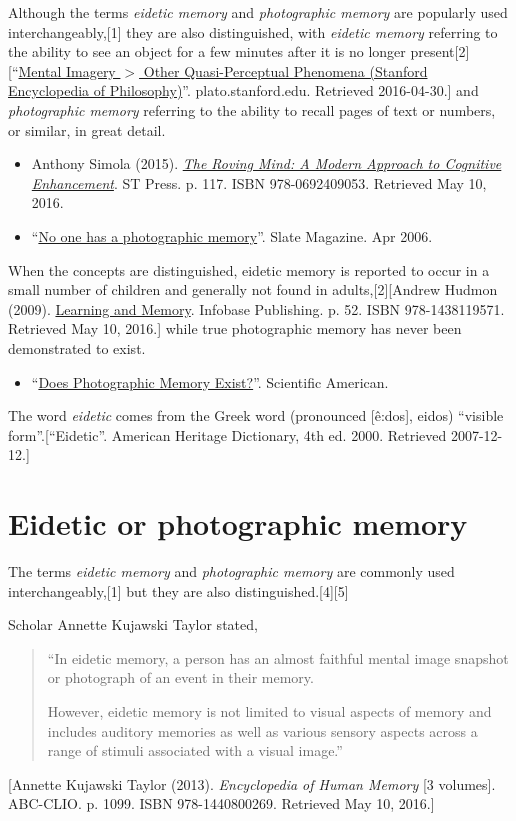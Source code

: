 \documentclass{book}
\numberwithin{equation}{section}
\begin{document}
Although the terms \textit{eidetic memory} and \textit{photographic memory} are popularly used interchangeably,[1] they are also distinguished, with \textit{eidetic memory} referring to the ability to see an object for a few minutes after it is no longer present[2][``\href{http://plato.stanford.edu/entries/mental-imagery/quasi-perceptual.html}{Mental Imagery $>$ Other Quasi-Perceptual Phenomena (Stanford Encyclopedia of Philosophy)}''. plato.stanford.edu. Retrieved 2016-04-30.] and \textit{photographic memory} referring to the ability to recall pages of text or numbers, or similar, in great detail.
\begin{itemize}
    \item Anthony Simola (2015). \href{https://books.google.com/books?id=p4ZMBwAAQBAJ&pg=PT117}{\textit{The Roving Mind: A Modern Approach to Cognitive Enhancement}}. ST Press. p. 117. ISBN 978-0692409053. Retrieved May 10, 2016.
    \item ``\href{http://www.slate.com/articles/health_and_science/science/2006/04/kaavya_syndrome.single.html}{No one has a photographic memory}''. Slate Magazine. Apr 2006.
\end{itemize}
When the concepts are distinguished, eidetic memory is reported to occur in a small number of children and generally not found in adults,[2][Andrew Hudmon (2009). \href{https://books.google.com/books?id=GKdUyxrqL6kC&pg=PA52}{Learning and Memory}. Infobase Publishing. p. 52. ISBN 978-1438119571. Retrieved May 10, 2016.] while true photographic memory has never been demonstrated to exist.
\begin{itemize}
    \item ``\href{http://www.scientificamerican.com/article/i-developed-what-appears-to-be-a-ph/}{Does Photographic Memory Exist?}''. Scientific American.
\end{itemize}
%
The word \textit{eidetic} comes from the Greek word  (pronounced [\^e:dos], eidos) ``visible form''.[``Eidetic''. American Heritage Dictionary, 4th ed. 2000. Retrieved 2007-12-12.]

\section{Eidetic or photographic memory}
The terms \textit{eidetic memory} and \textit{photographic memory} are commonly used interchangeably,[1] but they are also distinguished.[4][5]

Scholar Annette Kujawski Taylor stated,
\begin{quotation}
    ``In eidetic memory, a person has an almost faithful mental image snapshot or photograph of an event in their memory.
    
    However, eidetic memory is not limited to visual aspects of memory and includes auditory memories as well as various sensory aspects across a range of stimuli associated with a visual image.''
\end{quotation}
[Annette Kujawski Taylor (2013). \textit{Encyclopedia of Human Memory} [3 volumes]. ABC-CLIO. p. 1099. ISBN 978-1440800269. Retrieved May 10, 2016.]
\end{document}
